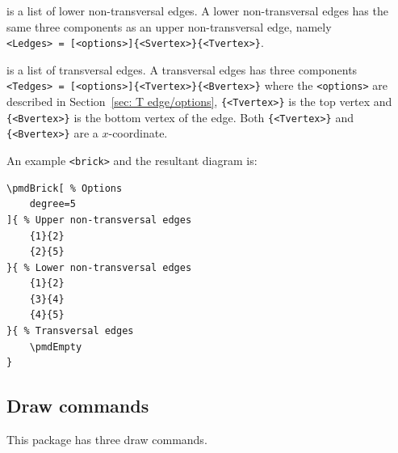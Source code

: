 \documentclass{ltxdoc}
\begin{document}
is a list of lower non-transversal edges. A lower non-transversal edges has the same three components as an upper non-transversal edge, namely \texttt{<Ledges>~=~[<options>]\{<Svertex>\}\{<Tvertex>\}}.

is a list of transversal edges. A transversal edges has three components \texttt{<Tedges>~=~[<options>]\{<Tvertex>\}\{<Bvertex>\}} where
the \texttt{<options>} are described in Section~\ref{sec: T edge/options},
\texttt{\{<Tvertex>\}} is the top vertex and
\texttt{\{<Bvertex>\}} is the bottom vertex of the edge. Both \texttt{\{<Tvertex>\}} and \texttt{\{<Bvertex>\}} are a \( x \)-coordinate.

An example \texttt{<brick>} and the resultant diagram is:
\begin{center}
    \begin{minipage}{\dimexpr0.85\textwidth-2\fboxrule-2\fboxsep\relax}
        \begin{minipage}[c]{0.4\linewidth}
\begin{verbatim}
\pmdBrick[ % Options
    degree=5
]{ % Upper non-transversal edges
    {1}{2}
    {2}{5}
}{ % Lower non-transversal edges
    {1}{2}
    {3}{4}
    {4}{5}
}{ % Transversal edges
    \pmdEmpty
}
\end{verbatim}
        \end{minipage}
        \hfill
        \begin{minipage}[c]{0.4\linewidth}
        \end{minipage}
    \end{minipage}%
\end{center}

\subsection{Draw commands}

This package has three draw commands.
\end{document}
